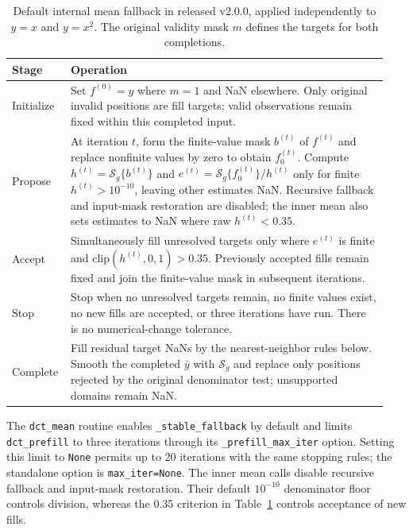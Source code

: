 \documentclass[a4paper,fleqn]{cas-sc}
\begin{document}
\begin{table}[htbp]
	\centering
	\caption{Default internal mean fallback in released v2.0.0, applied independently to $y=x$ and $y=x^2$. The original validity mask $m$ defines the targets for both completions.}
	\label{tab:nc_flow}
	\begin{tabular}{@{}p{0.12\linewidth}p{0.82\linewidth}@{}}
		\toprule
		Stage & Operation \\
		\midrule
		Initialize & Set $f^{(0)}=y$ where $m=1$ and NaN elsewhere. Only original invalid positions are fill targets; valid observations remain fixed within this completed input. \\
		Propose & At iteration $t$, form the finite-value mask $b^{(t)}$ of $f^{(t)}$ and replace nonfinite values by zero to obtain $f_0^{(t)}$. Compute $h^{(t)}=\mathcal{S}_g\{b^{(t)}\}$ and $e^{(t)}=\mathcal{S}_g\{f_0^{(t)}\}/h^{(t)}$ only for finite $h^{(t)}>10^{-10}$, leaving other estimates NaN. Recursive fallback and input-mask restoration are disabled; the inner mean also sets estimates to NaN where raw $h^{(t)}<0.35$. \\
		Accept & Simultaneously fill unresolved targets only where $e^{(t)}$ is finite and $\mathrm{clip}(h^{(t)},0,1)>0.35$. Previously accepted fills remain fixed and join the finite-value mask in subsequent iterations. \\
		Stop & Stop when no unresolved targets remain, no finite values exist, no new fills are accepted, or three iterations have run. There is no numerical-change tolerance. \\
		Complete & Fill residual target NaNs by the nearest-neighbor rules below. Smooth the completed $\bar{y}$ with $\mathcal{S}_g$ and replace only positions rejected by the original denominator test; unsupported domains remain NaN. \\
		\bottomrule
	\end{tabular}
\end{table}

The \texttt{dct\_mean} routine enables \texttt{\_stable\_fallback} by default and limits \texttt{dct\_prefill} to three iterations through its \texttt{\_prefill\_max\_iter} option. Setting this limit to \texttt{None} permits up to 20 iterations with the same stopping rules; the standalone option is \texttt{max\_iter=None}. The inner mean calls disable recursive fallback and input-mask restoration. Their default $10^{-10}$ denominator floor controls division, whereas the 0.35 criterion in Table~\ref{tab:nc_flow} controls acceptance of new fills.
\end{document}
